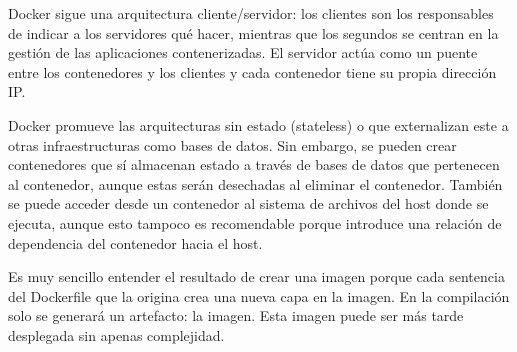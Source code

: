 \documentclass[11pt,a4paper]{article}
\begin{document}
Docker sigue una arquitectura cliente/servidor: los clientes son los responsables de indicar a los servidores qué hacer, mientras que los segundos se centran en la gestión de las aplicaciones contenerizadas. El servidor actúa como un puente entre los contenedores y los clientes y cada contenedor tiene su propia dirección IP.

Docker promueve las arquitecturas sin estado (stateless) o que externalizan este a otras infraestructuras como bases de datos. Sin embargo, se pueden crear contenedores que sí almacenan estado a través de bases de datos que pertenecen al contenedor, aunque estas serán desechadas al eliminar el contenedor. También se puede acceder desde un contenedor al sistema de archivos del host donde se ejecuta, aunque esto tampoco es recomendable porque introduce una relación de dependencia del contenedor hacia el host. 

Es muy sencillo entender el resultado de crear una imagen porque cada sentencia del Dockerfile que la origina crea una nueva capa en la imagen. En la compilación solo se generará un artefacto: la imagen. Esta imagen puede ser más tarde desplegada sin apenas complejidad.
\end{document}
